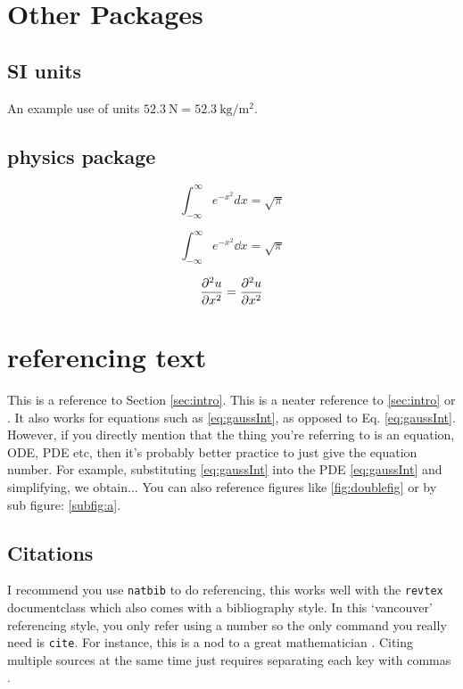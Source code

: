 \documentclass[
 reprint, %
 amsmath, amssymb, aps, %
 a4paper,
]{revtex4-2}
\begin{document}
\section{Other Packages}


\subsection{SI units}

An example use of units $\SI{52.3}{\newton}=\SI{52.3}{\kg\per\meter\squared}$.

\subsection{physics package}

\begin{equation}
    \int_{-\infty}^\infty e^{-x^2} d x = \sqrt{\pi} \label{eq:gaussInt}
\end{equation}

\begin{equation}
    \int_{-\infty}^\infty e^{-x^2} \dd x = \sqrt{\pi}
\end{equation}

\begin{equation}
    \frac{\partial^2u}{\partial x^2} = \pdv[2]{u}{x} \label{eq:partialDiffExample}
\end{equation}

\section{referencing text}
\label{sec:ref}

This is a reference to Section \ref{sec:intro}. This is a neater reference to \cref{sec:intro} or .
It also works for equations such as \cref{eq:gaussInt}, as opposed to Eq. \eqref{eq:gaussInt}.
However, if you directly mention that the thing you're referring to is an equation, ODE, PDE etc, then it's probably better practice to just give the equation number. 
For example, substituting \cref{eq:gaussInt} into the PDE \eqref{eq:gaussInt} and simplifying, we obtain...
You can also reference figures like \cref{fig:doublefig} or by sub figure: \cref{subfig:a}.

\subsection{Citations}

I recommend you use \texttt{natbib} to do referencing, this works well with the \texttt{revtex} documentclass which also comes with a bibliography style. 
In this `vancouver' referencing style, you only refer using a number so the only command you really need is \texttt{cite}. For instance, this is a nod to a great mathematician \cite{turing1990chemical}. 
Citing multiple sources at the same time just requires separating each key with commas \cite{turing1990chemical,cooley1967fft}.
\end{document}
